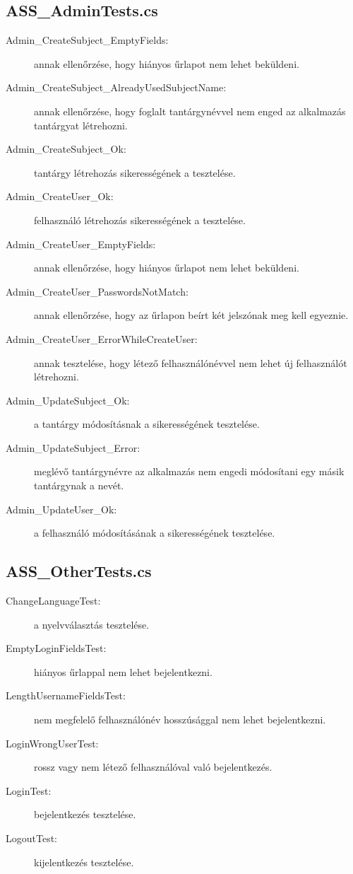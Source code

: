 \subsection{ASS\_AdminTests.cs}
\begin{description}
    \item[Admin\_CreateSubject\_EmptyFields:] annak ellenőrzése, hogy hiányos űrlapot nem lehet beküldeni.
    \item[Admin\_CreateSubject\_AlreadyUsedSubjectName:] annak ellenőrzése, hogy foglalt tantárgynévvel nem enged az alkalmazás tantárgyat létrehozni.
    \item[Admin\_CreateSubject\_Ok:] tantárgy létrehozás sikerességének a tesztelése.
    \item[Admin\_CreateUser\_Ok:] felhasználó létrehozás sikerességének a tesztelése.
    \item[Admin\_CreateUser\_EmptyFields:] annak ellenőrzése, hogy hiányos űrlapot nem lehet beküldeni.
    \item[Admin\_CreateUser\_PasswordsNotMatch:] annak ellenőrzése, hogy az űrlapon beírt két jelszónak meg kell egyeznie.
    \item[Admin\_CreateUser\_ErrorWhileCreateUser:] annak tesztelése, hogy létező felhasználónévvel nem lehet új felhasználót létrehozni.
    \item[Admin\_UpdateSubject\_Ok:] a tantárgy módosításnak a sikerességének tesztelése.
    \item[Admin\_UpdateSubject\_Error:] meglévő tantárgynévre az alkalmazás nem engedi módosítani egy másik tantárgynak a nevét.
    \item[Admin\_UpdateUser\_Ok:] a felhasználó módosításának a sikerességének tesztelése.
\end{description}
\subsection{ASS\_OtherTests.cs}
\begin{description}
    \item[ChangeLanguageTest:] a nyelvválasztás tesztelése.
    \item[EmptyLoginFieldsTest:] hiányos űrlappal nem lehet bejelentkezni.
    \item[LengthUsernameFieldsTest:] nem megfelelő felhasználónév hosszúsággal nem lehet bejelentkezni.
    \item[LoginWrongUserTest:] rossz vagy nem létező felhasználóval való bejelentkezés. 
    \item[LoginTest:] bejelentkezés tesztelése.
    \item[LogoutTest:] kijelentkezés tesztelése.
\end{description}
